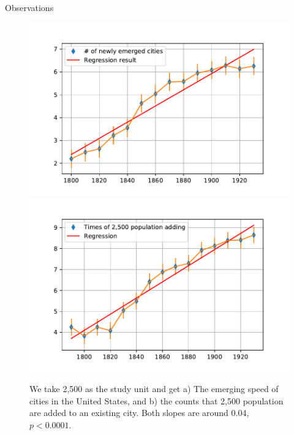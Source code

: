 \documentclass{beamer}
\begin{document}
\begin{frame}{Observations}
  \begin{figure}
    \includegraphics[width=0.48\linewidth]{pics/city_emerge.pdf}
    \includegraphics[width=0.48\linewidth]{pics/metapop_adding.pdf}
    \caption{We take 2,500 as the study unit and get a) The emerging speed of cities in the United States, and b) the counts that 2,500 population are added to an existing city. Both slopes are around 0.04, $p<0.0001$.}
  \end{figure}
\end{frame}
\end{document}
